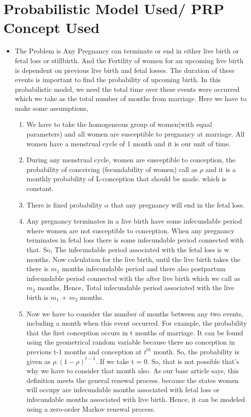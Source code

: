 \documentclass{article}
\begin{document}
\section {Probabilistic Model Used/ PRP Concept Used}
\begin{itemize}
 
\item The Problem is Any Pregnancy can terminate or end in either live birth or fetal loss or stillbirth. And the Fertility of women for an upcoming live birth is dependent on previous live birth and fetal losses. The duration of these events is important to find the probability of upcoming birth. In this probabilistic model, we need the total time over these events were occurred which we take as the total number of months from marriage. Here we have to make some assumptions,
\begin{center}
\end{center}
\begin{enumerate}
    \item We have to take the homogeneous group of women(with equal parameters) and all women are susceptible to pregnancy at marriage. All women have a menstrual cycle of 1 month and it is our unit of time.
    \item During any menstrual cycle, women are susceptible to conception, the probability of conceiving (fecundability of women) call as $\rho$ and it is a monthly probability of L-conception that should be made. which is constant.
    \item There is fixed probability $\alpha$ that any pregnancy will end in the fetal loss.
    \item Any pregnancy terminates in a live birth have some infecundable period where women are not susceptible to conception. When any pregnancy terminates in fetal loss there is some infecundable period connected with that. So, The infecundable period associated with the fetal loss is w months. Now calculation for the live birth, until the live birth takes the there is $m_1$ months infecundable period and there also postpartum infecundable period connected with the after live birth which we call as $m_2$ months. Hence, Total infecundable period associated with the live birth is $m_1$ + $m_2$ months.
    \item Now we have to consider the number of months between any two events, including a month when this event occurred. For example, the probability that the first conception occurs in t months of marriage. It can be found using the geometrical random variable because there no conception in previous t-1 months and conception at $t^{th}$ month. So, the probability is given as $\rho . (1 - \rho)^{t-1}$. If we take t = 0. So, that is not possible that's why we have to consider that month also. As our base article says, this definition meets the general renewal process. because the states women will occupy are infecundable months associated with fetal loss or infecundable months associated with live birth. Hence, it can be modeled using a zero-order Markov renewal process.

\end{enumerate}
\end{itemize}
\end{document}
